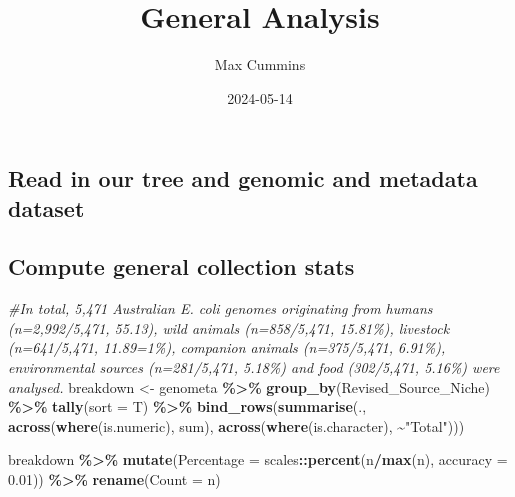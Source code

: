 \documentclass[
]{article}
\title{General Analysis}
\author{Max Cummins}
\date{2024-05-14}
\newenvironment{Shaded}{\begin{snugshade}}{\end{snugshade}}
\newcommand{\AttributeTok}[1]{\textcolor[rgb]{0.13,0.29,0.53}{#1}}
\newcommand{\CommentTok}[1]{\textcolor[rgb]{0.56,0.35,0.01}{\textit{#1}}}
\newcommand{\FloatTok}[1]{\textcolor[rgb]{0.00,0.00,0.81}{#1}}
\newcommand{\FunctionTok}[1]{\textcolor[rgb]{0.13,0.29,0.53}{\textbf{#1}}}
\newcommand{\NormalTok}[1]{#1}
\newcommand{\OtherTok}[1]{\textcolor[rgb]{0.56,0.35,0.01}{#1}}
\newcommand{\SpecialCharTok}[1]{\textcolor[rgb]{0.81,0.36,0.00}{\textbf{#1}}}
\newcommand{\StringTok}[1]{\textcolor[rgb]{0.31,0.60,0.02}{#1}}
\begin{document}
\maketitle

{
\setcounter{tocdepth}{2}
\tableofcontents
}
\hypertarget{read-in-our-tree-and-genomic-and-metadata-dataset}{%
\subsection{Read in our tree and genomic and metadata
dataset}\label{read-in-our-tree-and-genomic-and-metadata-dataset}}

\hypertarget{compute-general-collection-stats}{%
\subsection{Compute general collection
stats}\label{compute-general-collection-stats}}

\begin{Shaded}
\begin{Highlighting}[]
\CommentTok{\#In total, 5,471 Australian E. coli genomes originating from humans (n=2,992/5,471, 55.13), wild animals (n=858/5,471, 15.81\%), livestock (n=641/5,471, 11.89=1\%), companion animals (n=375/5,471, 6.91\%), environmental sources (n=281/5,471, 5.18\%) and food (302/5,471, 5.16\%) were analysed.}
\NormalTok{breakdown }\OtherTok{\textless{}{-}}\NormalTok{ genometa }\SpecialCharTok{\%\textgreater{}\%} \FunctionTok{group\_by}\NormalTok{(Revised\_Source\_Niche) }\SpecialCharTok{\%\textgreater{}\%} \FunctionTok{tally}\NormalTok{(}\AttributeTok{sort =}\NormalTok{ T)  }\SpecialCharTok{\%\textgreater{}\%} 
  \FunctionTok{bind\_rows}\NormalTok{(}\FunctionTok{summarise}\NormalTok{(.,}
                      \FunctionTok{across}\NormalTok{(}\FunctionTok{where}\NormalTok{(is.numeric), sum),}
                      \FunctionTok{across}\NormalTok{(}\FunctionTok{where}\NormalTok{(is.character), }\SpecialCharTok{\textasciitilde{}}\StringTok{"Total"}\NormalTok{)))}

\NormalTok{breakdown }\SpecialCharTok{\%\textgreater{}\%} \FunctionTok{mutate}\NormalTok{(}\AttributeTok{Percentage =}\NormalTok{ scales}\SpecialCharTok{::}\FunctionTok{percent}\NormalTok{(n}\SpecialCharTok{/}\FunctionTok{max}\NormalTok{(n), }\AttributeTok{accuracy =} \FloatTok{0.01}\NormalTok{)) }\SpecialCharTok{\%\textgreater{}\%} \FunctionTok{rename}\NormalTok{(}\StringTok{\textquotesingle{}Count\textquotesingle{}} \OtherTok{=}\NormalTok{ n)}
\end{Highlighting}
\end{Shaded}
\end{document}

